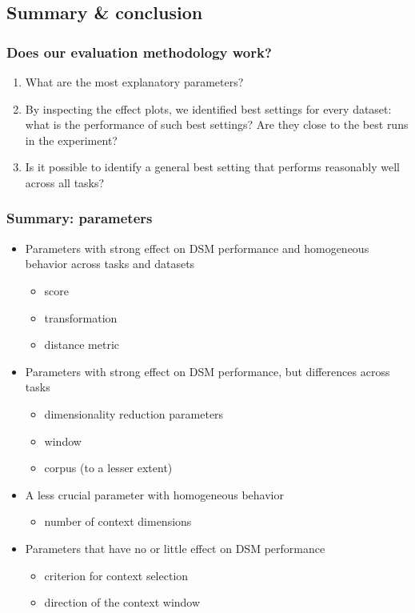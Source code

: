 \documentclass[t]{beamer} %
\begin{document}
\subsection{Summary \& conclusion}

\begin{frame}
  \frametitle{Does our evaluation methodology work?}

  \begin{enumerate}
  \item What are the most explanatory parameters?
  \item By inspecting the effect plots, we identified best settings for every dataset: what is the performance of such best settings? Are they close to the best runs in the experiment? 
  \item Is it possible to identify a general best setting that performs reasonably well across all tasks?
  \end{enumerate}
  
\end{frame}


\begin{frame}
  \frametitle{Summary: parameters}
  
  \ungap[1]
  \begin{itemize}
  \item Parameters with strong effect on DSM performance and homogeneous behavior across tasks and datasets
    \begin{itemize}
    \item score
    \item transformation
    \item distance metric
    \end{itemize}
  \item<2-> Parameters with strong effect on DSM performance, but differences across tasks
    \begin{itemize}
    \item dimensionality reduction parameters
    \item window
    \item corpus (to a lesser extent)
    \end{itemize}
  \item<3-> A less crucial parameter with homogeneous behavior
    \begin{itemize}
    \item number of context dimensions
    \end{itemize}
  \item<4-> Parameters that have no or little effect on DSM performance
    \begin{itemize}
    \item criterion for context selection
    \item direction of the context window
    \end{itemize}
  \end{itemize}
\end{frame}
\end{document}
